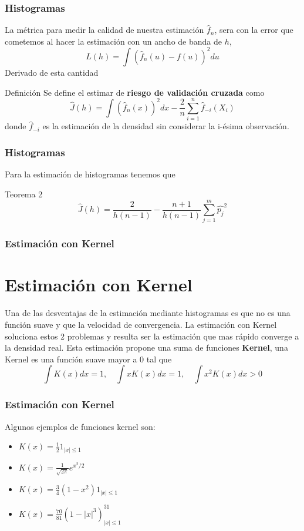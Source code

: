 \documentclass[aspectratio=169,spanish]{beamer}
\begin{document}
\begin{frame}
\frametitle{Histogramas}
La métrica para medir la calidad de nuestra estimación $\hat{f}_n$, sera con la error que cometemos al hacer la estimación con un ancho de banda de $h$, $$L(h)=\int (\hat{f}_n(u)-f(u))^2du$$ 
Derivado de esta cantidad 
\begin{block}{Definición}
Se define el estimar de \textbf{riesgo de validación cruzada} como $$\hat{J}(h)=\int (\hat{f}_n(x))^2dx - \frac{2}{n}\sum_{i=1}^{n}\hat{f}_{-i}(X_i)$$ donde $\hat{f}_{-i}$ es la estimación de la densidad sin considerar la i-ésima observación.
\end{block}
\end{frame}


\begin{frame}
\frametitle{Histogramas}
Para la estimación de histogramas tenemos que 
\begin{block}{Teorema 2}
$$\hat{J}(h)=\frac{2}{h(n-1)}-\frac{n+1}{h(n-1)}\sum_{j=1}^{m}\hat{p_j}^2$$
\end{block}
\end{frame}

\begin{frame}
\frametitle{Estimación con Kernel}
\section{Estimación con Kernel}
Una de las desventajas de la estimación mediante histogramas es que no es una función suave y que la velocidad de convergencia. La estimación con Kernel soluciona estos 2 problemas y resulta ser la estimación que mas rápido converge a la densidad real. Esta estimación propone una suma de funciones \textbf{Kernel}, una Kernel es una función suave mayor a 0 tal que 
$$\int	K(x)dx=1,\quad \int xK(x)dx=1,\quad \int x^2K(x)dx>0$$
\end{frame}

\begin{frame}
\frametitle{Estimación con Kernel}
Algunos ejemplos de funciones kernel son:
\begin{itemize}
\item $K(x)=\frac{1}{2}1_{|x| \le 1}$
\item $K(x)=\frac{1}{\sqrt{2\pi}}e^{x^2/2}$
\item $K(x)=\frac{3}{4}(1-x^2)1_{|x| \le 1}$
\item $K(x)=\frac{70}{81}(1-|x|^3)^31_{|x| \le 1}$
\end{itemize}
\end{frame}
\end{document}
